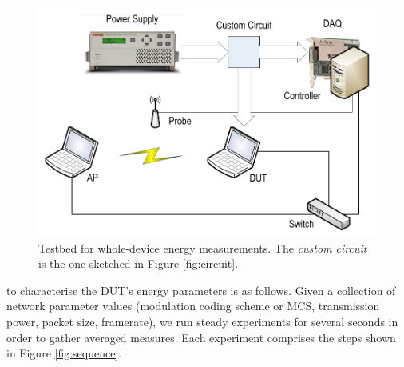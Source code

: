 \documentclass[twoside,nohyper]{tufte-book}
\begin{document}
\begin{figure}

{\centering \includegraphics{img/03/testbed} 

}

\caption[Testbed for whole-device energy measurements. The \emph{custom circuit} is the one sketched in Figure \ref{fig:circuit}.]{Testbed for whole-device energy measurements. The \emph{custom circuit} is the one sketched in Figure \ref{fig:circuit}.}\label{fig:testbed}
\end{figure}

 to characterise the DUT's energy parameters is as follows. Given a collection of network parameter values (modulation coding scheme or MCS, transmission power, packet size, framerate), we run steady experiments for several seconds in order to gather averaged measures. Each experiment comprises the steps shown in Figure \ref{fig:sequence}.
\end{document}
